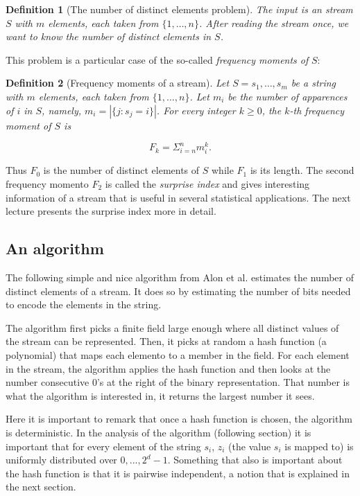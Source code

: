 \documentclass[12pt]{article}
\newtheorem{definition}{Definition}
\begin{document}
\begin{definition}[The number of distinct elements problem]
The input is an stream $S$ with $m$ elements, each taken from $\{1, \hdots, n\}$.
After reading the stream once, we want to know the number of distinct elements in $S$.
\end{definition}

This problem is a particular case of the so-called \emph{frequency moments of} $S$:


\begin{definition}[Frequency moments of a stream]
Let $S = s_1, \hdots, s_m$ be a string with $m$ elements, each taken from $\{1, \hdots, n\}$.
Let $m_i$ be the number of apparences of $i$ in $S$, namely, $m_i = | \{j : s_j = i\} |$.
For every integer $k \geq 0$, the \emph{$k$-th frequency moment of $S$} is

$$F_k = \Sigma^n_{i = n} m_i^k.$$ 
\end{definition}


Thus $F_0$ is the number of distinct elements of $S$ while $F_1$ is its length.
The second frequency momento $F_2$ is called the \emph{surprise index}
and gives interesting information of a stream that is useful in several statistical applications.
The next lecture presents the surprise index more in detail.

\subsection{An algorithm}

The following simple and nice algorithm from Alon et al. estimates the number of distinct elements of a stream.
It does so by estimating the number of bits needed to encode the elements in the string.

The algorithm first picks a finite field large enough where all distinct values of the stream can be
represented. Then, it picks at random a hash function (a polynomial) that maps each elemento to
a member in the field. 
For each element in the stream, the algorithm applies the hash function and then
looks at the number consecutive 0's at the right of the binary representation.
That number is what the algorithm is interested in, it returns the largest number it sees.

Here it is important to remark that once a hash function is chosen, the algorithm is deterministic. In the analysis of 
the algorithm (following section) it is important that for every element of the string $s_i$,
$z_i$ (the value $s_i$ is mapped to) is uniformly distributed over ${0, ..., 2^d-1}$.
Something that also is important about the hash function is that it is pairwise independent,
a notion that is explained in the next section.
\end{document}
